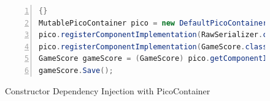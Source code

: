 \begin{figure}[ht]
	\centering
	\begin{minipage}[b]{12cm}
	\begin{center}	
\begin{scriptsize}
\begin{lstlisting}[numbers=left,language=Java,frame=leftline]{}
MutablePicoContainer pico = new DefaultPicoContainer();
pico.registerComponentImplementation(RawSerializer.class);
pico.registerComponentImplementation(GameScore.class);
GameScore gameScore = (GameScore) pico.getComponentInstance(GameScore.class);
gameScore.Save();
		\end{lstlisting}
		\end{scriptsize}
	\end{center}
	\end{minipage}
	\caption{Constructor Dependency Injection with PicoContainer}
	\label{c2f:pico1}
\end{figure}

